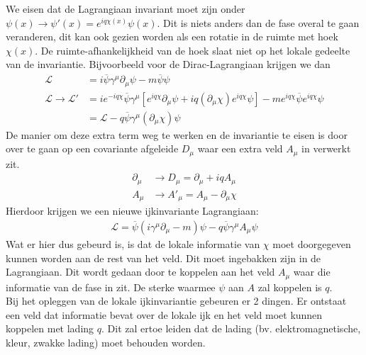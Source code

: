 \documentclass[../main.tex]{subfiles}
\begin{document}
We eisen dat de Lagrangiaan invariant moet zijn onder $\psi(x) \rightarrow \psi'(x) = e^{iq\chi(x)}\psi(x)$. Dit is niets anders dan de fase overal te gaan veranderen, dit kan ook gezien worden als een rotatie in de ruimte met hoek $\chi(x)$. De ruimte-afhankelijkheid van de hoek slaat niet op het lokale gedeelte van de invariantie. Bijvoorbeeld voor de Dirac-Lagrangiaan krijgen we dan
\begin{equation}
    \begin{aligned}
        \label{eq:lok_ijk_inv_dir_1}
        \mathcal{L} &= i\overline \psi \gamma^\mu \partial_\mu \psi - m \overline \psi\psi\\
        \mathcal{L} \rightarrow \mathcal{L}' &= i e^{-iq\chi} \overline \psi \gamma^\mu [e^{iq\chi}\partial_\mu \psi + iq(\partial_\mu\chi) e^{iq\chi}\psi] - m e^{iq\chi} \overline \psi e^{iq\chi}\psi\\
                                             &=\mathcal{L} - q\overline \psi \gamma^\mu (\partial_\mu \chi)\psi
    \end{aligned}
\end{equation}
De manier om deze extra term weg te werken en de invariantie te eisen is door over te gaan op een covariante afgeleide $D_\mu$ waar een extra veld $A_\mu$ in verwerkt zit.
\begin{equation}
    \begin{aligned}
        \label{eq:cov_afgeleide}
        \partial_\mu &\rightarrow D_\mu = \partial_\mu + iqA_\mu\\
        A_\mu &\rightarrow A'_\mu = A_\mu - \partial_\mu \chi
    \end{aligned}
\end{equation}
Hierdoor krijgen we een nieuwe ijkinvariante Lagrangiaan:
\begin{equation}
    \begin{aligned}
        \label{eq:lok_ijk_inv_dir_2}
        \mathcal{L} = \overline \psi (i\gamma^\mu \partial_\mu - m)\psi - q\overline\psi\gamma^\mu A_\mu\psi
    \end{aligned}
\end{equation}
Wat er hier dus gebeurd is, is dat de lokale informatie van $\chi$ moet doorgegeven kunnen worden aan de rest van het veld. Dit moet ingebakken zijn in de Lagrangiaan. Dit wordt gedaan door te koppelen aan het veld $A_\mu$ waar die informatie van de fase in zit. De sterke waarmee $\psi$ aan $A$ zal koppelen is $q$.\\
Bij het opleggen van de lokale ijkinvariantie gebeuren er 2 dingen. Er ontstaat een veld dat informatie bevat over de lokale ijk en het veld moet kunnen koppelen met lading $q$. Dit zal ertoe leiden dat de lading (bv. elektromagnetische, kleur, zwakke lading) moet behouden worden.\\ 
\end{document}
